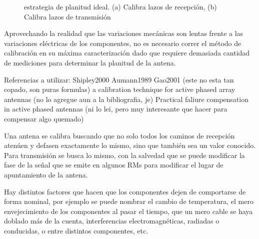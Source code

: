 \begin{figure}[H]
 \centering
 \caption{estrategia de planitud ideal. (a) Calibra lazos de recepción, (b) Calibra lazos de transmisión}
 \label{fig:ideal_strategy}
\end{figure}




Aprovechando la realidad que las variaciones mecánicas son lentas frente a las variaciones eléctricas de los componentes,
no es necesario correr el método de calibración en su máxima caracterización dado que requiere demasiada cantidad de 
mediciones para determinar la planitud de la antena.


Referencias a utilizar: 
Shipley2000
Aumann1989
Gao2001 (este no esta tan copado, son puras formulas)
a calibration technique for active phased array antennas (no lo agregue aun a la bibliografia, je)
Practical faliure compensation in active phased antennas (ni lo lei, pero muy interesante que hacer para compensar algo quemado)


Una antena se calibra buscando que no solo todos los caminos de recepción atenúen y defasen exactamente lo mismo, sino que 
también sea un valor conocido. Para transmisión se busca lo mismo, con la salvedad que se puede modificar la fase de la 
señal que se emite en algunos RMs para modificar el lugar de apuntamiento de la antena.

Hay distintos factores que hacen que los componentes dejen de comportarse de forma nominal, por ejemplo se puede nombrar el
cambio de temperatura, el mero envejecimiento de los componentes al pasar el tiempo, que un mero cable se haya doblado más
de la cuenta, interferencias electromagnéticas, radiadas o conducidas, o entre distintos componentes, etc. 

